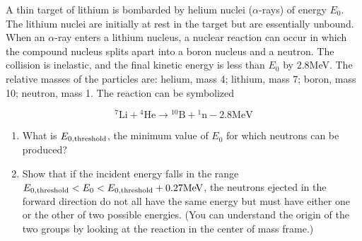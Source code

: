 \documentclass[12pt,letterpaper]{hmcpset}
\newcommand{\val}[2]{$#1$#2}
\begin{document}
\begin{problem}
    A thin target of lithium is bombarded 
    by helium nuclei ($\alpha$-rays) of
    energy $E_{0}$. The lithium nuclei are 
    initially at rest in the target but are
    essentially unbound. When an $\alpha$-ray
    enters a lithium nucleus, a nuclear reaction
    can occur in which the compound nucleus 
    splits apart into a boron nucleus and a 
    neutron. The collision is inelastic, and
    the final kinetic energy is less than $E_{0}$
    by \val{2.8}{MeV}. The relative masses of the
    particles are: helium, mass 4; lithium, mass 7;
    boron, mass 10; neutron, mass 1. The reaction
    can be symbolized

    \[
        {}^7\text{Li} + {}^4\text{He} \longrightarrow {}^{10}\text{B} + {}^1\text{n} - 2.8\text{MeV}
    \]

    \begin{enumerate}
    \item What is $E_{0,\rm threshold}$, the minimum value
        of $E_{0}$ for which neutrons can be produced?
    \item Show that if the incident energy falls in the 
        range $E_{0,\rm threshold} < E_{0} <E_{0,\rm threshold}
        + 0.27\text{MeV}$, the neutrons ejected in the forward 
        direction do not all have the same energy but must
        have either one or the other of two possible energies.
        (You can understand the origin of the two groups by 
        looking at the reaction in the center of mass frame.)
    \end{enumerate}
\end{problem}

\begin{solution}
    \vfill
\end{solution}
\clearpage
\end{document}
